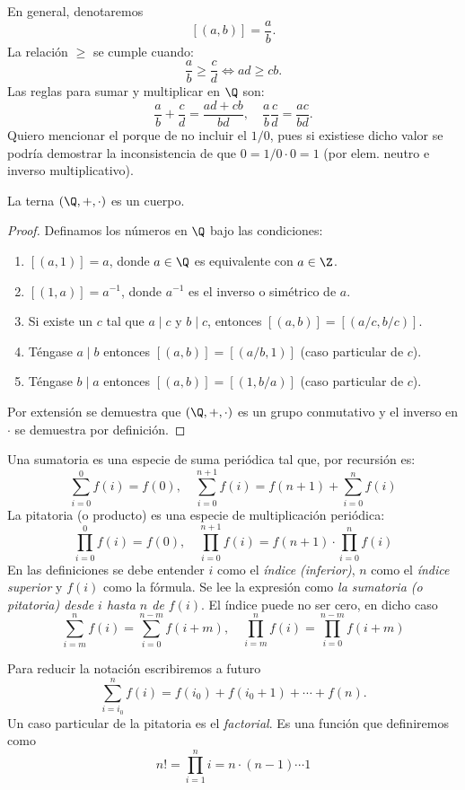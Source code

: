 \documentclass[11pt,oneside,a4paper]{book}
\begin{document}
En general, denotaremos
$$[(a,b)]=\frac{a}{b}.$$
La relación $\geq$ se cumple cuando:
$$\frac{a}{b}\geq\frac{c}{d}\iff ad\geq cb.$$
Las reglas para sumar y multiplicar en $\Q$ son:
$$\frac{a}{b}+\frac{c}{d}=\frac{ad+cb}{bd},\quad\frac{a}{b}\frac{c}{d}=\frac{ac}{bd}.$$
Quiero mencionar el porque de no incluir el $1/0$, pues si existiese dicho valor se podría demostrar la inconsistencia de que $0=1/0\cdot 0=1$ (por elem. neutro e inverso multiplicativo).
\begin{thm}
La terna $(\Q,+,\cdot)$ es un cuerpo.
\end{thm}
\begin{proof}
Definamos los números en $\Q$ bajo las condiciones:
\begin{enumerate}[$a$)]
\item $[(a,1)]=a$, donde $a\in\Q$ es equivalente con $a\in\Z$.
\item $[(1,a)]=a^{-1}$, donde $a^{-1}$ es el inverso o simétrico de $a$.
\item Si existe un $c$ tal que $a\mid c$ y $b\mid c$, entonces $[(a,b)]=[(a/c,b/c)]$.
\item Téngase $a\mid b$ entonces $[(a,b)]=[(a/b,1)]$ (caso particular de $c$).
\item Téngase $b\mid a$ entonces $[(a,b)]=[(1,b/a)]$ (caso particular de $c$).
\end{enumerate}
Por extensión se demuestra que $(\Q,+,\cdot)$ es un grupo conmutativo y el inverso en $\cdot$ se demuestra por definición.
\end{proof}
\begin{mydef}
Una sumatoria es una especie de suma periódica tal que, por recursión es:
$$\sum_{i=0}^0 f(i)=f(0),\quad \sum_{i=0}^{n+1} f(i)=f(n+1)+\sum_{i=0}^n f(i)$$
La pitatoria (o producto) es una especie de multiplicación periódica:
$$\prod_{i=0}^0 f(i)=f(0),\quad \prod_{i=0}^{n+1} f(i)=f(n+1)\cdot\prod_{i=0}^n f(i)$$
En las definiciones se debe entender $i$ como el \textit{índice (inferior)}, $n$ como el \textit{índice superior} y $f(i)$ como la fórmula. Se lee la expresión como \textit{la sumatoria (o pitatoria) desde $i$ hasta $n$ de $f(i)$}. El índice puede no ser cero, en dicho caso
$$\sum_{i=m}^n f(i)=\sum_{i=0}^{n-m} f(i+m),\quad\prod_{i=m}^n f(i)=\prod_{i=0}^{n-m} f(i+m)$$
\end{mydef}
Para reducir la notación escribiremos a futuro
$$\sum_{i=i_0}^n f(i)=f(i_0)+f(i_0+1)+\cdots+f(n).$$
Un caso particular de la pitatoria es el \textit{factorial}. Es una función que definiremos como
$$
n!=\prod_{i=1}^n i=n\cdot(n-1)\cdots 1
$$
\end{document}
